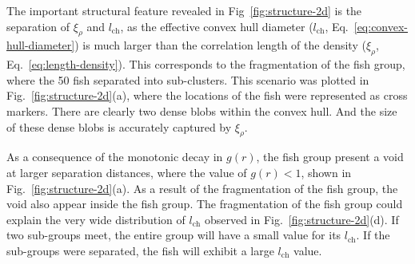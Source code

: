 \documentclass[11pt,twoside]{report}
\begin{document}
The important structural feature revealed in Fig~\ref{fig:structure-2d} is the separation of $\xi_\rho$ and $l_\mathrm{ch}$, as the effective convex hull diameter ($l_\mathrm{ch}$, Eq.~\ref{eq:convex-hull-diameter}) is much larger than the correlation length of the density ($\xi_\rho$, Eq.~\ref{eq:length-density}).
This corresponds to the fragmentation of the fish group, where the 50 fish separated into sub-clusters. This scenario was plotted in Fig.~\ref{fig:structure-2d}(a), where the locations of the fish were represented as cross markers. There are clearly two dense blobs within the convex hull. And the size of these dense blobs is accurately captured by $\xi_\rho$.

As a consequence of the monotonic decay in $g(r)$, the fish group present a void at larger separation distances, where the value of $g(r) < 1$, shown in Fig.~\ref{fig:structure-2d}(a). As a result of the fragmentation of the fish group, the void also appear inside the fish group. The fragmentation of the fish group could explain the very wide distribution of $l_\mathrm{ch}$ observed in Fig.~\ref{fig:structure-2d}(d). If two sub-groups meet, the entire group will have a small value for its $l_\mathrm{ch}$. If the sub-groups were separated, the fish will exhibit a large $l_\mathrm{ch}$ value. 
\end{document}
